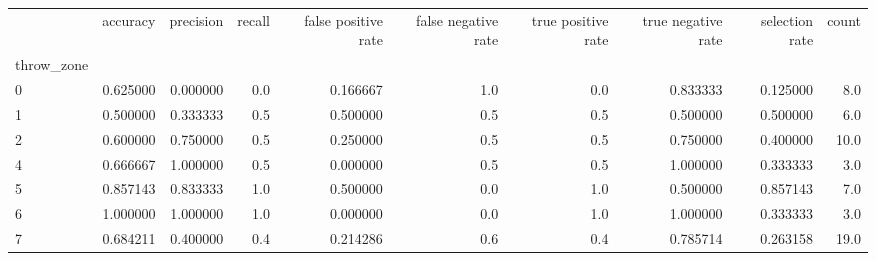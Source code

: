 \begin{tabular}{lrrrrrrrrr}
\toprule
{} &  accuracy &  precision &  recall &  false positive rate &  false negative rate &  true positive rate &  true negative rate &  selection rate &  count \\
throw\_zone &           &            &         &                      &                      &                     &                     &                 &        \\
\midrule
0          &  0.625000 &   0.000000 &     0.0 &             0.166667 &                  1.0 &                 0.0 &            0.833333 &        0.125000 &    8.0 \\
1          &  0.500000 &   0.333333 &     0.5 &             0.500000 &                  0.5 &                 0.5 &            0.500000 &        0.500000 &    6.0 \\
2          &  0.600000 &   0.750000 &     0.5 &             0.250000 &                  0.5 &                 0.5 &            0.750000 &        0.400000 &   10.0 \\
4          &  0.666667 &   1.000000 &     0.5 &             0.000000 &                  0.5 &                 0.5 &            1.000000 &        0.333333 &    3.0 \\
5          &  0.857143 &   0.833333 &     1.0 &             0.500000 &                  0.0 &                 1.0 &            0.500000 &        0.857143 &    7.0 \\
6          &  1.000000 &   1.000000 &     1.0 &             0.000000 &                  0.0 &                 1.0 &            1.000000 &        0.333333 &    3.0 \\
7          &  0.684211 &   0.400000 &     0.4 &             0.214286 &                  0.6 &                 0.4 &            0.785714 &        0.263158 &   19.0 \\
\bottomrule
\end{tabular}
